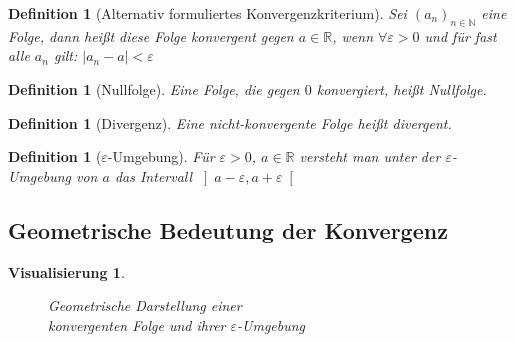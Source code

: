 \documentclass[11pt, twoside, a4paper]{article}
\theoremstyle{plain}
\newtheorem{definition}[blockelement]{Definition}
\newtheorem{visualisierung}[blockelement]{Visualisierung}
\newcommand{\abs}[1]{\left|#1\right|}
\newcommand{\naturalnumbers}{\mathbb{N}}
\newcommand{\realnumbers}{\mathbb{R}}
\begin{document}
    \begin{definition}[Alternativ formuliertes Konvergenzkriterium]
        Sei $(a_n)_{n\in\naturalnumbers}$ eine Folge, dann heißt diese Folge konvergent gegen $a\in\realnumbers$, wenn $\forall \varepsilon > 0$ und für fast alle $a_n$ gilt: $\abs{a_n-a}<\varepsilon$
    \end{definition}

    \begin{definition}[Nullfolge]
        Eine Folge, die gegen $0$ konvergiert, heißt Nullfolge.
    \end{definition}

    \begin{definition}[Divergenz]
        Eine nicht-konvergente Folge heißt divergent.
    \end{definition}

    \begin{definition}[$\varepsilon$-Umgebung]
        Für $\varepsilon > 0$, $a\in\realnumbers$ versteht man unter der $\varepsilon$-Umgebung von $a$ das Intervall $\left]a-\varepsilon, a+\varepsilon\right[$
    \end{definition}

    \subsection{Geometrische Bedeutung der Konvergenz}

    \begin{visualisierung}
        ~
        \begin{figure}[H]
            \centering
            \caption{Geometrische Darstellung einer\\ konvergenten Folge und ihrer $\varepsilon$-Umgebung}
        \end{figure}
    \end{visualisierung}
\end{document}
